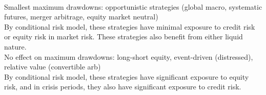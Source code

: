\begin{remark} \\
Smallest maximum drawdowns: opportunistic strategies (global macro, systematic futures, merger arbitrage, equity market neutral)\\
By conditional risk model, these strategies have minimal exposure to credit risk or equity risk in market risk. These strategies also benefit from either liquid nature.\\
No effect on maximum drawdowns: long-short equity, event-driven (distressed), relative value (convertible arb)\\
By conditional risk model, these strategies have significant exposure to equity risk, and in crisis periods, they also have significant exposure to credit risk.
\end{remark}